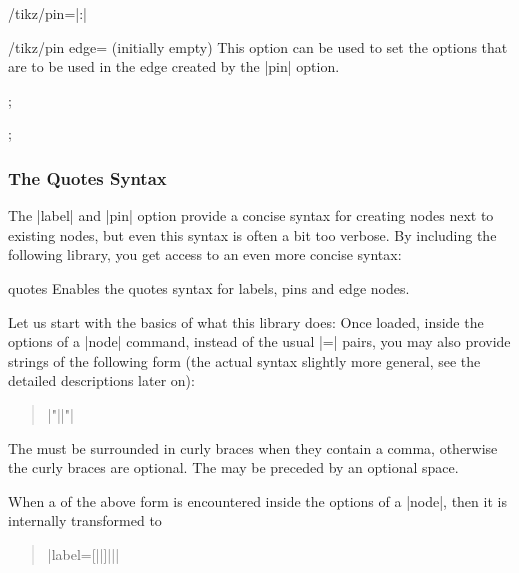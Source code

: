 \begin{key}{/tikz/pin=|:|}
  \begin{key}{/tikz/pin edge= (initially \normalfont empty)}
    This option can be used to set the options that are to be used
    in the edge created by the |pin| option.
\begin{codeexample}[]
\tikz[pin distance=10mm]
  ;
\end{codeexample}
\begin{codeexample}[]
\tikz [every pin edge/.style={},
       initial/.style={pin={[pin distance=5mm,
                             pin edge={<-,shorten <=1pt}]left:start}}]
  ;
\end{codeexample}
  \end{key}
\end{key}


\subsubsection{The Quotes Syntax}
\label{section-label-quotes}

The |label| and |pin| option provide a concise syntax for creating
nodes next to existing nodes, but even this syntax is often a bit too
verbose. By including the following library, you get access to an even
more concise syntax:

\begin{tikzlibrary}{quotes}
  Enables the quotes syntax for labels, pins and edge nodes.
\end{tikzlibrary}

Let us start with the basics of what this library does: Once loaded,
inside the options of a |node| command, instead of the usual
|=| pairs, you may also provide strings of the
following form (the actual syntax slightly more general, see the
detailed descriptions later on):
\begin{quote}
  |"||"|
\end{quote}
The  must be surrounded in curly braces when they
contain a comma, otherwise the curly braces are optional. The may be
preceded by an optional space.

When a  of the above form is encountered inside the
options of a |node|, then it is internally transformed to
\begin{quote}
  |label={[||]||}|
\end{quote}

